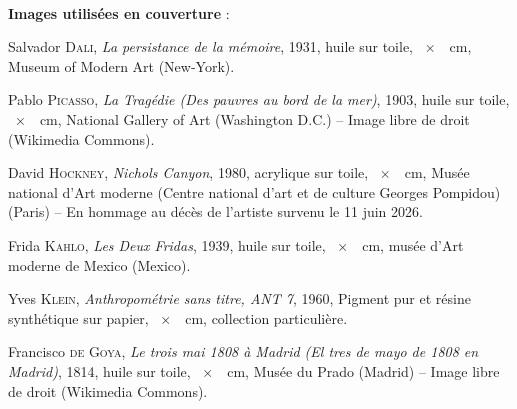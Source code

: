 \pagestyle{plain}
\renewcommand{\headrulewidth}{0.0pt}
~

\vfill
\textbf{Images utilisées en couverture} :\vspace{6pt}

\setlength{\parskip}{3pt}
Salvador \textsc{Dali}, \textit{La persistance de la mémoire}, 1931, huile sur toile, ~×~~cm, Museum of Modern Art (New-York).

Pablo \textsc{Picasso}, \textit{La Tragédie (Des pauvres au bord de la mer)}, 1903, huile sur toile, ~×~~cm, National Gallery of Art (Washington D.C.)  -- Image libre de droit (Wikimedia Commons).

David \textsc{Hockney}, \textit{Nichols Canyon}, 1980, acrylique sur toile, ~×~~cm,  Musée national d'Art moderne (Centre national d'art et de culture Georges Pompidou) (Paris)  -- En hommage au décès de l'artiste survenu le 11 juin 2026.

Frida \textsc{Kahlo}, \textit{Les Deux Fridas}, 1939, huile sur toile, ~×~~cm, musée d'Art moderne de Mexico (Mexico).

Yves \textsc{Klein}, \textit{Anthropométrie sans titre, ANT 7}, 1960,  	
Pigment pur et résine synthétique sur papier, ~×~~cm, collection particulière.

Francisco \textsc{de Goya}, \textit{Le trois mai 1808 à Madrid (El tres de mayo de 1808 en Madrid)}, 1814, huile sur toile, ~×~~cm, Musée du Prado (Madrid)  -- Image libre de droit (Wikimedia Commons).

\vspace*{12pt}

\doclicenseIcon \doclicenseLongText
\setlength{\parskip}{6pt}